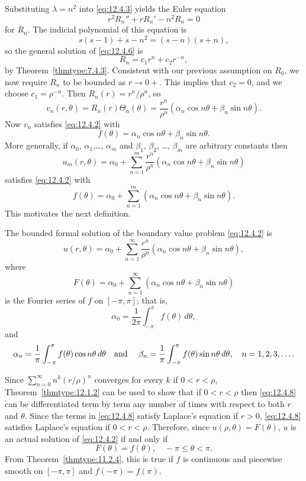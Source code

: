 Substituting $\lambda=n^{2}$ into \eqref{eq:12.4.3} yields the Euler equation
\begin{equation}
  \label{eq:12.4.6}r^{2}R_{n}''+rR_{n}'-n^{2}R_{n}=0
\end{equation}
for $R_{n}$. The indicial polynomial of this equation is
\[
  s(s-1)+s-n^{2}=(s-n)(s+n),
\]
so the general solution of \eqref{eq:12.4.6} is
\begin{equation}
  \label{eq:12.4.7}R_{n}=c_{1}r^{n}+c_{2}r^{-n},
\end{equation}
by Theorem~\ref{thmtype:7.4.3}. Consistent with our previous assumption on $R_{0}$, we now require
$R_{n}$ to be bounded as $r\to0+$. This implies that $c_{2}=0$, and we choose $c_{1}=\rho^{-n}$.
Then $R_{n}(r)=r^{n}/\rho^{n}$, so
\[
  v_{n}(r,\theta)=R_{n}(r)\Theta_{n}(\theta)=\frac{r^{n}}{\rho^{n}}(\alpha_{n}\cos n\theta+\beta_{n}\sin n\theta).
\]
Now $v_{n}$ satisfies \eqref{eq:12.4.2} with
\[
  f(\theta)=\alpha_{n}\cos n\theta+\beta_{n}\sin n\theta.
\]
More generally, if $\alpha_{0}$, $\alpha_{1}$,\dots, $\alpha_{m}$ and $\beta_{1}$, $\beta_{2}$,
\dots, $\beta_{m}$ are arbitrary constants then
\[
  u_{m}(r,\theta)=\alpha_{0}+\sum_{n=1}^{m}\frac{r^{n}}{\rho^{n}}(\alpha_{n}\cos n\theta+\beta_{n}\sin n\theta)
\]
satisfies \eqref{eq:12.4.2} with
\[
  f(\theta) =\alpha_{0}+\sum_{n=1}^{m}(\alpha_{n}\cos n\theta+\beta_{n}\sin n\theta).
\]
This motivates the next definition.

\begin{definition}
  \color{blue}
  \label{thmtype:12.4.1} \rm The bounded formal solution of the boundary value problem
  \eqref{eq:12.4.2} is
  \begin{equation}
    \label{eq:12.4.8}u(r,\theta)=\alpha_{0}+\sum_{n=1}^{\infty}\frac{r^{n}}{\rho^{n}}(\alpha_{n}\cos n\theta+\beta_{n}\sin n\theta),
  \end{equation}
  where
  \[
    F(\theta) =\alpha_{0}+\sum_{n=1}^{\infty}(\alpha_{n}\cos n\theta+\beta_{n}\sin n\theta)
  \]
  is the Fourier series of $f$ on $[-\pi,\pi]$; that is,
  \[
    \alpha_{0}=\frac{1}{2\pi}\int_{-\pi}^{\pi}f(\theta)\,d\theta,
  \]
  and
  \[
    \alpha_{n}=\frac{1}{\pi}\int_{-\pi}^{\pi}f(\theta)\cos n\theta\,d\theta \text{\quad and \quad}\beta_{n}=\frac{1}{\pi}\int_{-\pi}^{\pi}f(\theta)\sin n\theta\,d\theta, \quad n=1,2,3,\dots.
  \]
\end{definition}

Since $\sum_{n=0}^{\infty}n^{k}(r/\rho)^{n}$ converges for every $k$ if $0<r<\rho$,
Theorem~\ref{thmtype:12.1.2} can be used to show that if $0<r<\rho$ then \eqref{eq:12.4.8} can be
differentiated term by term any number of times with respect to both $r$ and $\theta$. Since the
terms in \eqref{eq:12.4.8} satisfy Laplace's equation if $r>0$, \eqref{eq:12.4.8} satisfies
Laplace's equation if $0<r<\rho$. Therefore, since $u(\rho,\theta)=F(\theta)$, $u$ is an actual
solution of \eqref{eq:12.4.2} if and only if
\[
  F(\theta)=f(\theta),\quad-\pi\le\theta<\pi.
\]
From Theorem~\ref{thmtype:11.2.4}, this is true if $f$ is continuous and piecewise smooth on
$[-\pi,\pi]$ and $f(-\pi)=f(\pi)$.


